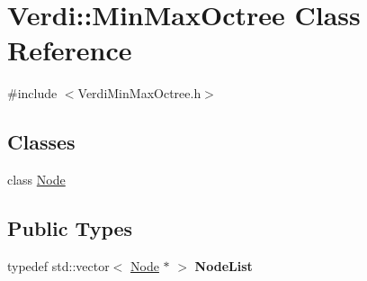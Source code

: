 \hypertarget{class_verdi_1_1_min_max_octree}{\section{\-Verdi\-:\-:\-Min\-Max\-Octree \-Class \-Reference}
\label{class_verdi_1_1_min_max_octree}
}


{\ttfamily \#include $<$\-Verdi\-Min\-Max\-Octree.\-h$>$}

\subsection*{\-Classes}
\begin{DoxyCompactItemize}
\item 
class \hyperlink{class_verdi_1_1_min_max_octree_1_1_node}{\-Node}
\end{DoxyCompactItemize}
\subsection*{\-Public \-Types}
\begin{DoxyCompactItemize}
\item 
\hypertarget{class_verdi_1_1_min_max_octree_a59c139cbb1b7b287a94f0b4442b2fbda}{typedef std\-::vector$<$ \hyperlink{class_verdi_1_1_min_max_octree_1_1_node}{\-Node} $\ast$ $>$ {\bfseries \-Node\-List}}\label{class_verdi_1_1_min_max_octree_a59c139cbb1b7b287a94f0b4442b2fbda}

\end{DoxyCompactItemize}
